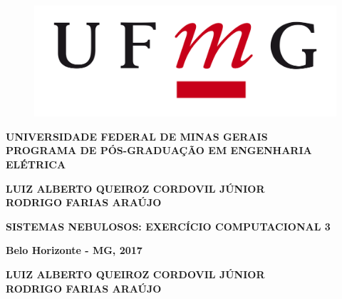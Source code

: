 \documentclass[12pt,a4paper]{article}
\numberwithin{equation}{section}
\begin{document}

\thispagestyle{empty}
\hspace{-1cm}
\begin{minipage}{0.35\textwidth}
\vspace{-2cm}
  \begin{figure}[H]
    \includegraphics[scale=0.07]{figures/UFMG-logo.png}
  \end{figure}
\end{minipage}
\begin{minipage}{0.7\textwidth}
\textbf{UNIVERSIDADE FEDERAL DE MINAS GERAIS} \\
\textbf{PROGRAMA DE PÓS-GRADUAÇÃO EM ENGENHARIA ELÉTRICA}\\
\end{minipage}


\vspace{40mm}
\begin{center}
\textbf{
LUIZ ALBERTO QUEIROZ CORDOVIL JÚNIOR \\
RODRIGO FARIAS ARAÚJO}
\end{center}

\vspace{50 mm}
\begin{center}
\textbf{SISTEMAS NEBULOSOS: EXERCÍCIO COMPUTACIONAL 3}\\
\end{center}

\vspace{85mm}

\begin{center}
\textbf{Belo Horizonte - MG, 2017}
\end{center}
\thispagestyle{empty}
\newpage


\thispagestyle{empty}

\vspace{3 mm}
\begin{center}
\textbf{
LUIZ ALBERTO QUEIROZ CORDOVIL JÚNIOR \\
RODRIGO FARIAS ARAÚJO}
\end{center}
\end{document}
